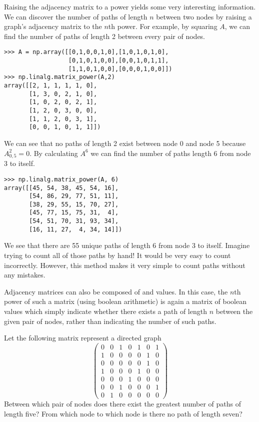 Raising the adjacency matrix to a power yields some very interesting information.
We can discover the number of paths of length $n$ between two nodes by raising a graph's adjacency matrix to the $n$th power.
For example, by squaring $A$, we can find the number of paths of length 2 between every pair of nodes.
\begin{lstlisting}
>>> A = np.array([[0,1,0,0,1,0],[1,0,1,0,1,0],
                  [0,1,0,1,0,0],[0,0,1,0,1,1],
                  [1,1,0,1,0,0],[0,0,0,1,0,0]])
>>> np.linalg.matrix_power(A,2)
array([[2, 1, 1, 1, 1, 0],
       [1, 3, 0, 2, 1, 0],
       [1, 0, 2, 0, 2, 1],
       [1, 2, 0, 3, 0, 0],
       [1, 1, 2, 0, 3, 1],
       [0, 0, 1, 0, 1, 1]])
\end{lstlisting}
We can see that no paths of length 2 exist between node 0 and node 5 because $A^2_{0,5} = 0$.
By calculating $A^6$ we can find the number of paths length 6 from node 3 to itself.
\begin{lstlisting}
>>> np.linalg.matrix_power(A, 6)
array([[45, 54, 38, 45, 54, 16],
       [54, 86, 29, 77, 51, 11],
       [38, 29, 55, 15, 70, 27],
       [45, 77, 15, 75, 31,  4],
       [54, 51, 70, 31, 93, 34],
       [16, 11, 27,  4, 34, 14]])
\end{lstlisting}
We see that there are 55 unique paths of length 6 from node 3 to itself.
Imagine trying to count all of those paths by hand!
It would be very easy to count incorrectly.
However, this method makes it very simple to count paths without any mistakes.

Adjacency matrices can also be composed of  and  values.
In this case, the $n$th power of such a matrix (using boolean arithmetic)
is again a matrix of
boolean values which simply indicate whether there exists a path of length $n$ between the given pair of nodes, rather than indicating the number of such
paths.

\begin{problem}
Let the following matrix represent a directed graph
\[
\begin{pmatrix}
0 & 0 & 1 & 0 & 1 & 0 & 1 \\
1 & 0 & 0 & 0 & 0 & 1 & 0 \\
0 & 0 & 0 & 0 & 0 & 1 & 0 \\
1 & 0 & 0 & 0 & 1 & 0 & 0 \\
0 & 0 & 0 & 1 & 0 & 0 & 0 \\
0 & 0 & 1 & 0 & 0 & 0 & 1 \\
0 & 1 & 0 & 0 & 0 & 0 & 0
\end{pmatrix}
\]
Between which pair of nodes does there exist the greatest number of paths
of length five?
From which node to which node is there no path of length seven?
\end{problem}

